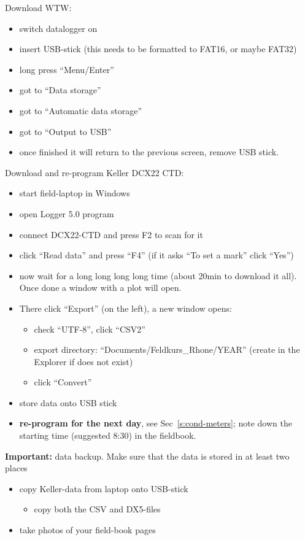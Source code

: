 \documentclass[DIV=15,halfparskip,11pt,headinclude]{scrartcl}
\begin{document}
Download WTW:
\begin{itemize}
\item switch datalogger on
\item insert USB-stick (this needs to be formatted to FAT16, or maybe FAT32)
\item long press ``Menu/Enter''
\item got to ``Data storage''
\item got to ``Automatic data storage''
\item got to ``Output to USB''
\item once finished it will return to the previous screen, remove USB
  stick.
\end{itemize}

Download and re-program Keller DCX22 CTD:
\begin{itemize}
\item start field-laptop in Windows
\item open Logger 5.0 program
\item connect DCX22-CTD and press F2 to scan for it
\item click ``Read data'' and press ``F4''
  (if it asks ``To set a mark'' click ``Yes'')
\item now wait for a long long long long time (about 20min to
  download it all).  Once done a window with a plot will open.
\item There click ``Export'' (on the left), a new window opens:
  \begin{itemize}
  \item check ``UTF-8'', click ``CSV2''
  \item export directory: ``Documents/Feldkurs\_Rhone/YEAR'' (create
    in the Explorer if does not exist)
  \item click ``Convert''
  \end{itemize}
\item store data onto USB stick
\item \textbf{re-program for the next day}, see Sec~\ref{s:cond-meters}; note
  down the starting time (suggested 8:30) in the fieldbook.
\end{itemize}

\textbf{Important:} data backup.  Make sure that the data is
stored in at least two places
\begin{itemize}
\item copy Keller-data from laptop onto USB-stick
  \begin{itemize}
  \item copy both the CSV and DX5-files
  \end{itemize}
\item take photos of your field-book pages
\end{itemize}
\end{document}
